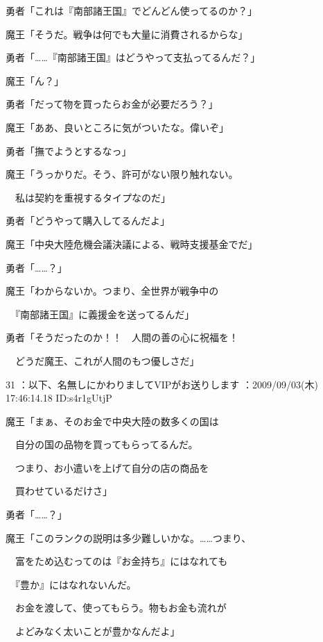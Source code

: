 \documentclass[a4j,twocolumn]{tarticle}
\begin{document}
勇者「これは『南部諸王国』でどんどん使ってるのか？」\par{} 
魔王「そうだ。戦争は何でも大量に消費されるからな」 



勇者「……『南部諸王国』はどうやって支払ってるんだ？」\par{} 
魔王「ん？」\par{} 
勇者「だって物を買ったらお金が必要だろう？」\par{} 
魔王「ああ、良いところに気がついたな。偉いぞ」 



勇者「撫でようとするなっ」\par{} 
魔王「うっかりだ。そう、許可がない限り触れない。\par{} 
　私は契約を重視するタイプなのだ」 



勇者「どうやって購入してるんだよ」\par{} 
魔王「中央大陸危機会議決議による、戦時支援基金でだ」 



勇者「……？」\par{} 
魔王「わからないか。つまり、全世界が戦争中の \par{}
　『南部諸王国』に義援金を送ってるんだ」 



勇者「そうだったのか！！　人間の善の心に祝福を！\par{} 
　どうだ魔王、これが人間のもつ優しさだ」 

	
    
    

31 ：以下、名無しにかわりましてVIPがお送りします ：2009/09/03(木) 17:46:14.18 ID:s4r1gUtjP 


魔王「まぁ、そのお金で中央大陸の数多くの国は\par{} 
　自分の国の品物を買ってもらってるんだ。\par{} 
　つまり、お小遣いを上げて自分の店の商品を\par{} 
　買わせているだけさ」 



勇者「……？」 



魔王「このランクの説明は多少難しいかな。……つまり、\par{} 
　富をため込むってのは『お金持ち』にはなれても \par{}
　『豊か』にはなれないんだ。\par{} 
　お金を渡して、使ってもらう。物もお金も流れが \par{}
　よどみなく太いことが豊かなんだよ」 
\end{document}
